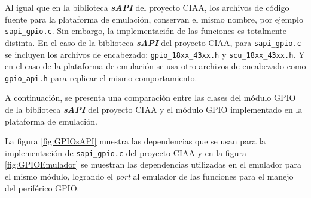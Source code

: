 Al igual que en la biblioteca \textit{\textbf{sAPI}} del proyecto CIAA, los archivos de código fuente para la plataforma de emulación, conservan el mismo nombre, por ejemplo  \texttt{sapi\_gpio.c}. Sin embargo, la implementación de las funciones es totalmente distinta. En el caso de la biblioteca \textit{\textbf{sAPI}} del proyecto CIAA, para \texttt{sapi\_gpio.c}  se incluyen los archivos de encabezado: \texttt{gpio\_18xx\_43xx.h} y \newline \texttt{scu\_18xx\_43xx.h}. Y en el caso de la plataforma de emulación se usa otro archivos de encabezado como \texttt{gpio\_api.h} para replicar el mismo comportamiento.

A continuación, se presenta una comparación entre las clases del módulo GPIO de la biblioteca \textit{\textbf{sAPI}} del proyecto CIAA y el módulo GPIO implementado en la plataforma de emulación. 

La figura \ref{fig:GPIOsAPI} muestra las dependencias que se usan para la implementación de \newline \texttt{sapi\_gpio.c} del proyecto CIAA y en la figura \ref{fig:GPIOEmulador} se muestran las dependencias utilizadas en el emulador para el mismo módulo, logrando el \textit{port} al emulador de las funciones para el manejo del periférico GPIO.


\hfill \break
\hfill \break
\hfill \break
\hfill \break
\hfill \break
\hfill \break
\hfill \break
\hfill \break
\hfill \break
\hfill \break
\hfill \break
\hfill \break

